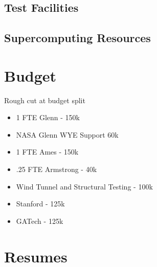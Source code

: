 \documentclass[]{aiaa-tc}
\begin{document}
    \subsection{Test Facilities}
    \subsection{Supercomputing Resources}

  \appendix

  \section{Budget}
    Rough cut at budget split
    \begin{itemize}
        \item 1 FTE Glenn - 150k 
        \item NASA Glenn WYE Support 60k 
        \item 1 FTE Ames - 150k 
        \item .25 FTE Armstrong - 40k
        \item Wind Tunnel and Structural Testing - 100k 
        \item Stanford - 125k 
        \item GATech - 125k
    \end{itemize}

  \section{Resumes}


  
\end{document}
